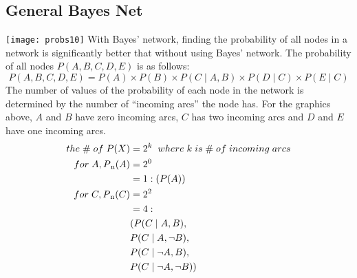 \documentclass[12pt]{article}
\begin{document}
\subsection*{General Bayes Net}
\texttt{[image: probs10]}
With Bayes' network, finding the probability of all nodes in a network is significantly better that without using Bayes' network. The probability of all nodes \(P(A, B, C, D, E)\) is as follows:
\begin{equation}
P(A, B, C, D, E) = P(A) \times P(B) \times P(C \mid A,B) \times P(D \mid C) \times P(E \mid C)
\end{equation}
The number of values of the probability of each node in the network is determined by the number of \enquote{incoming arcs} the node has. For the graphics above, \(A\) and \(B\) have zero incoming arcs, \(C\) has two incoming arcs and \(D\) and \(E\) have one incoming arcs.\\
\begin{align*}
the\;\#\;of\;P(X) &= 2^{k}\;\;where\;k\;is\;\#\;of\;incoming\;arcs\\
for\;A, P\textsubscript{n}(A) &= 2^{0}\\
&= 1 : ( P(A) )\\
for\;C, P\textsubscript{n}(C) &= 2^{2}\\
&= 4 : \\
& ( P(C \mid A, B),\\
& P(C \mid A, \neg B),\\
& P(C \mid \neg A, B),\\
& P(C \mid \neg A, \neg B) )\\
\end{align*}
\end{document}
